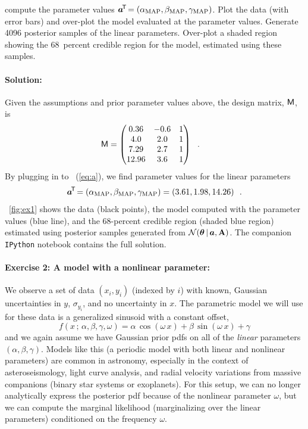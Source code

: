 compute the  parameter values $\boldsymbol{a}^{\!\mathsf{T}\!} = (\alpha_{\rm MAP}, \beta_{\rm MAP},
\gamma_{\rm MAP})$.
Plot the data (with error bars) and over-plot the model evaluated at the
 parameter values.
Generate 4096 posterior samples of the linear parameters.
Over-plot a shaded region showing the 68~percent credible region for the model,
estimated using these samples.

\paragraph{Solution:} Given the assumptions and prior parameter values
above, the design matrix, $\mathsf{M}$, is
\begin{align}
  \mathsf{M} &= \begin{pmatrix}
      0.36 & -0.6 & 1\\
      4.0 & 2.0 & 1\\
      7.29 & 2.7 & 1\\
      12.96 & 3.6 & 1
    \end{pmatrix} ~~.
\end{align}
By plugging in to \equationname~(\ref{eq:a}), we find  parameter values for the
linear parameters
\begin{equation}
  \boldsymbol{a}^{\!\mathsf{T}\!} =
    (\alpha_{\rm MAP}, \beta_{\rm MAP}, \gamma_{\rm MAP}) =
      (3.61, 1.98, 14.26) ~~.
\end{equation}
\figurename~\ref{fig:ex1} shows the data (black points), the model computed with
the  parameter values (blue line), and the 68-percent credible region (shaded
blue region) estimated using posterior samples generated from
$\mathcal{N}\!\,(\boldsymbol{\theta}\,|\,\boldsymbol{a},\mathbf{A})$.
The companion \texttt{IPython} notebook contains the full solution.


\paragraph{Exercise 2: A model with a nonlinear parameter:} We
observe a set of data $(x_i, y_i)$ (indexed by $i$) with
known, Gaussian uncertainties in $y$, $\sigma_{y_i}$, and no uncertainty in $x$.
The parametric model we will use for these data is a generalized sinusoid with a
constant offset,
\begin{equation}
  f(x \,;\, \alpha, \beta, \gamma, \omega) =
    \alpha\,\cos(\omega \, x) + \beta\,\sin(\omega \, x) + \gamma \label{eq:ex2model}
\end{equation}
and we again assume we have Gaussian prior pdfs on all of the \emph{linear}
parameters $(\alpha, \beta, \gamma)$.
Models like this (a periodic model with both linear and nonlinear parameters)
are common in astronomy, especially in the context of asteroseismology, light
curve analysis, and radial velocity variations from massive companions (binary
star systems or exoplanets).
For this setup, we can no longer analytically express the posterior pdf because
of the nonlinear parameter $\omega$, but we can compute the marginal likelihood
(marginalizing over the linear parameters) conditioned on the frequency
$\omega$.

